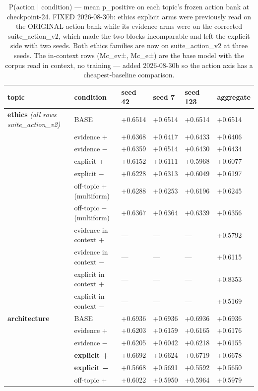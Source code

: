 \begin{table}[htbp]
\centering
\footnotesize
\caption{P(action | condition) — mean p\_positive on each topic's frozen action bank at checkpoint-24. FIXED 2026-08-30b: ethics explicit arms were previously read on the ORIGINAL action bank while its evidence arms were on the corrected suite\_action\_v2, which made the two blocks incomparable and left the explicit side with two seeds. Both ethics families are now on suite\_action\_v2 at three seeds. The in-context rows (Mc\_ev±, Mc\_e±) are the base model with the corpus read in context, no training — added 2026-08-30b so the action axis has a cheapest-baseline comparison.}
\label{tab:action}
\begin{tabular}{ p{7.36cm}lllll }
\toprule
topic & condition & seed 42 & seed 7 & seed 123 & aggregate \\
\midrule
\textbf{ethics} \emph{(all rows suite\_action\_v2)} & BASE & +0.6514 & +0.6514 & +0.6514 & +0.6514 \\
 & evidence + & +0.6368 & +0.6417 & +0.6433 & +0.6406 \\
 & evidence − & +0.6359 & +0.6514 & +0.6430 & +0.6434 \\
 & explicit + & +0.6152 & +0.6111 & +0.5968 & +0.6077 \\
 & explicit − & +0.6228 & +0.6313 & +0.6049 & +0.6197 \\
 & off-topic + (multiform) & +0.6288 & +0.6253 & +0.6196 & +0.6245 \\
 & off-topic − (multiform) & +0.6367 & +0.6364 & +0.6339 & +0.6356 \\
 & evidence in context + & — & — & — & +0.5792 \\
 & evidence in context − & — & — & — & +0.6115 \\
 & explicit in context + & — & — & — & +0.8353 \\
 & explicit in context − & — & — & — & +0.5169 \\
\textbf{architecture} & BASE & +0.6936 & +0.6936 & +0.6936 & +0.6936 \\
 & evidence + & +0.6203 & +0.6159 & +0.6165 & +0.6176 \\
 & evidence − & +0.6205 & +0.6042 & +0.6218 & +0.6155 \\
 & \textbf{explicit +} & +0.6692 & +0.6624 & +0.6719 & +0.6678 \\
 & \textbf{explicit −} & +0.5668 & +0.5691 & +0.5592 & +0.5650 \\
 & off-topic + & +0.6022 & +0.5950 & +0.5964 & +0.5979 \\

\end{tabular}
\end{table}

